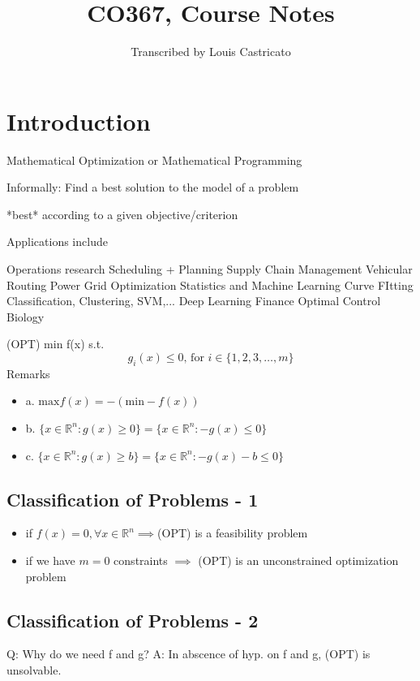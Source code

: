 \documentclass[titlepage]{article}
\title{CO367, Course Notes}
\author{Transcribed by Louis Castricato}
\theoremstyle{plain}
\theoremstyle{definition}
\theoremstyle{remark}
\begin{document}
\maketitle
\section*{Introduction}

Mathematical Optimization or Mathematical Programming

Informally: Find a best solution to the model of a problem

*best* according to a given objective/criterion

Applications include
\begin{outline}[enumerate]
\1 Operations research
\2 Scheduling + Planning
\2 Supply Chain Management
\2 Vehicular Routing
\2 Power Grid Optimization
\1 Statistics and Machine Learning
\2 Curve FItting
\2 Classification, Clustering, SVM,...
\2 Deep Learning
\1 Finance
\1 Optimal Control
\1 Biology
\end{outline}
(OPT) min f(x) s.t.
\[g_i(x) \leq 0\text{, for } i \in\{1, 2, 3, \hdots, m\}\]
Remarks
\begin{itemize}
\item a. $\text{max} f(x) = -(\text{min} -f(x))$
\item b. $\{x \in \mathbb{R}^n:g(x) \geq 0\} = \{x \in \mathbb{R}^n : -g(x) \leq 0\}$
\item c. $\{x \in \mathbb{R}^n : g(x) \geq b\} = \{ x \in \mathbb{R}^n : -g(x) -  b \leq 0\}$
\end{itemize}
\subsection*{Classification of Problems - 1}
\begin{itemize}
\item if $f(x) = 0, \forall x  \in \mathbb{R}^n \implies$(OPT) is a feasibility
problem
\item if we have $m = 0$ constraints $\implies$ (OPT) is an unconstrained
optimization problem
\end{itemize}
\subsection*{Classification of Problems - 2}
Q: Why do we need f and g?
A: In abscence of hyp. on f and g, (OPT) is unsolvable.
\end{document}
